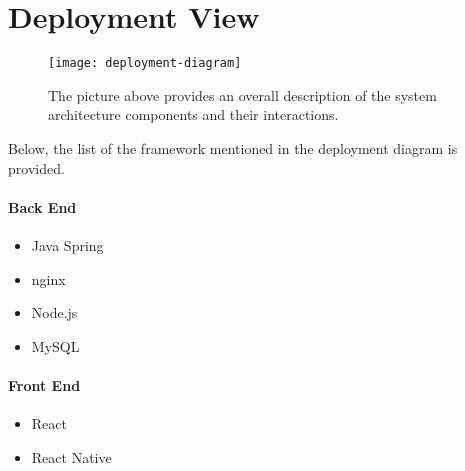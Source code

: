 \section{Deployment View}

\begin{figure}[H]
	\centering
	\texttt{[image: deployment-diagram]}
	\caption[Deployment Diagram]{The picture above provides an overall description of the system architecture components and their interactions.}
	\label{fig:deployment}
\end{figure}

Below, the list of the framework mentioned in the deployment diagram is provided.

\paragraph{Back End}
\begin{itemize}
	\item Java Spring \cite{spring}
	\item nginx \cite{nginx}
	\item Node.js \cite{nodejs}
	\item MySQL {\cite{mysql}}
\end{itemize}

\paragraph{Front End}
\begin{itemize}
	\item React \cite{react}
	\item React Native \cite{react-native}
\end{itemize}
